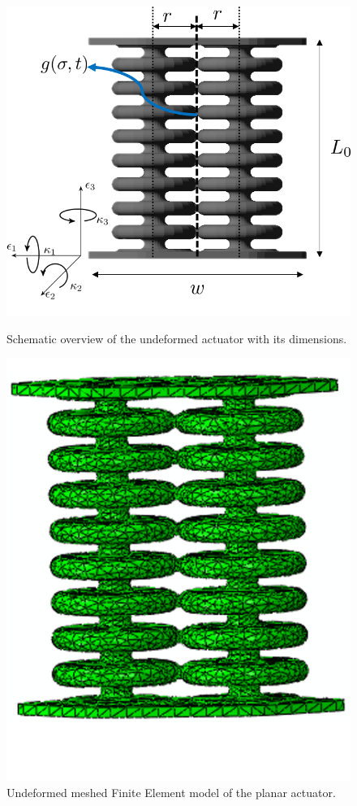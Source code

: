 \begin{figure}[H] 
    \begin{minipage}[b]{0.5\linewidth}
     \centering
    \includegraphics[width=\linewidth]{Figures/Chapter3/dimensions.png} 
    \caption{Schematic overview of the undeformed actuator with its dimensions.} 
    \label{fig3:dim} 
       \end{minipage} 
    \begin{minipage}[b]{0.5\linewidth}
     \centering
    \includegraphics[width=0.7\linewidth]{Figures/Chapter3/undeformed2.png} 
    \caption{Undeformed meshed Finite Element model of the planar actuator.} 
    \label{fig3:FemModel} 
    \end{minipage} 
\end{figure}

